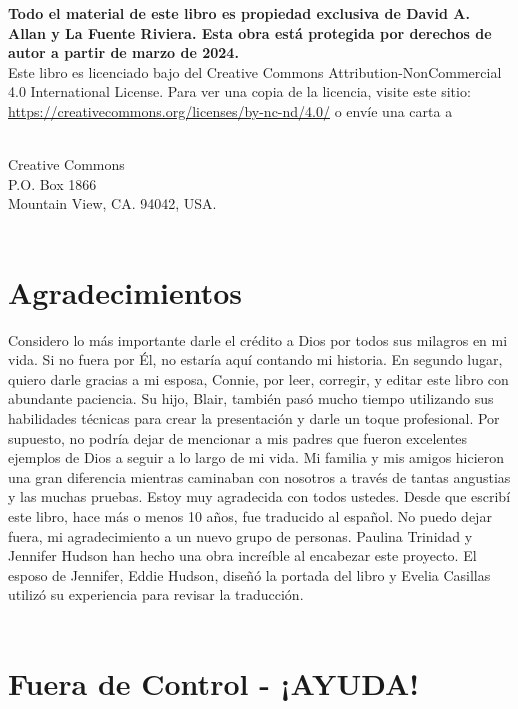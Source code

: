 \documentclass[twoside, 12pt]{book}
\begin{document}
\clearpage 

\textbf{Todo el material de este libro es propiedad exclusiva de David A. Allan y La Fuente Riviera. Esta obra está protegida por derechos de autor a partir de marzo de 2024.} \\

Este libro es licenciado bajo del Creative Commons Attribution-NonCommercial 4.0 International License. Para ver una copia de la licencia, visite este sitio: \\ \href{https://creativecommons.org/licenses/by-nc-nd/4.0//}{https://creativecommons.org/licenses/by-nc-nd/4.0/} o envíe una carta a \\
\

\begin{center}
Creative Commons\\
P.O. Box 1866\\
Mountain View, CA. 94042, USA.\\
\
\end{center}

\chapter*{Agradecimientos}
Considero lo más importante darle el crédito a Dios por todos sus milagros en mi vida. Si no fuera por Él, no estaría aquí contando mi historia. En segundo lugar, quiero darle gracias a mi esposa, Connie, por leer, corregir, y editar este libro con abundante paciencia. Su hijo, Blair, también pasó mucho tiempo utilizando sus habilidades técnicas para crear la presentación y darle un toque profesional. Por supuesto, no podría dejar de mencionar a mis padres que fueron excelentes ejemplos de Dios a seguir a lo largo de mi vida. Mi familia y mis amigos hicieron una gran diferencia mientras caminaban con nosotros a través de tantas angustias y las muchas pruebas. Estoy muy agradecida con todos ustedes.
Desde que escribí este libro, hace más o menos 10 años, fue traducido al español. No puedo dejar fuera, mi agradecimiento a un nuevo grupo de personas. Paulina Trinidad y Jennifer Hudson han hecho una obra increíble al encabezar este proyecto. El esposo de Jennifer, Eddie Hudson, diseñó la portada del libro y Evelia Casillas utilizó su experiencia para revisar la traducción.\\
\

\clearpage

\tableofcontents
\clearpage
\mainmatter
\chapter{Fuera de Control - ¡AYUDA! }
\
\end{document}
